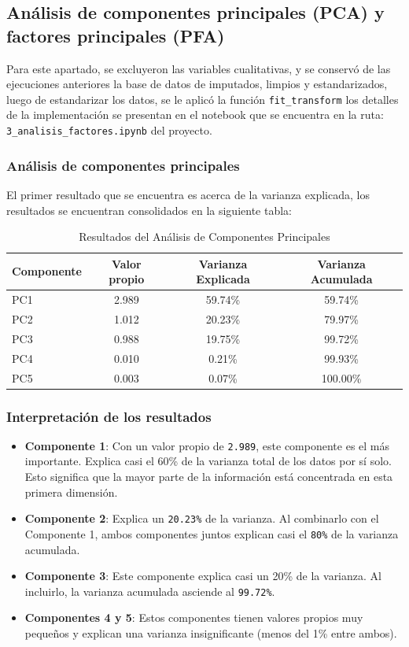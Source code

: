 \documentclass[journal]{IEEEtran}
\begin{document}
	\subsection{Análisis de componentes principales (PCA) y factores principales (PFA)}
	Para este apartado, se excluyeron las variables cualitativas, y se conservó de las ejecuciones anteriores la base de datos de imputados, limpios y estandarizados, luego de estandarizar los datos, se le aplicó la función \texttt{fit\_transform} los detalles de la implementación se presentan en el notebook que se encuentra en la ruta: \texttt{3\_analisis\_factores.ipynb} del proyecto.
	\subsubsection{Análisis de componentes principales}
	El primer resultado que se encuentra es acerca de la varianza explicada, los resultados se encuentran consolidados en la siguiente tabla:

	\begin{table}[H]
		\centering
		\caption{Resultados del Análisis de Componentes Principales}
		\begin{tabular}{l c c c}
			\toprule
			Componente & Valor propio & Varianza Explicada & Varianza Acumulada \\
			\midrule
			PC1 & 2.989 & 59.74\% & 59.74\% \\
			PC2 & 1.012 & 20.23\% & 79.97\% \\
			PC3 & 0.988 & 19.75\% & 99.72\% \\
			PC4 & 0.010 & 0.21\%  & 99.93\% \\
			PC5 & 0.003 & 0.07\% & 100.00\% \\
			\bottomrule
		\end{tabular}
		\label{tab:pca_results}
	\end{table}
	\subsubsection{Interpretación de los resultados}
	\begin{itemize}
		\item \textbf{Componente 1}: Con un valor propio de \texttt{2.989}, este componente es el más importante. Explica casi el 60\% de la varianza total de los datos por sí solo. Esto significa que la mayor parte de la información está concentrada en esta primera dimensión.
		\item \textbf{Componente 2}: Explica un \texttt{20.23\%} de la varianza. Al combinarlo con el Componente 1, ambos componentes juntos explican casi el \texttt{80\%} de la varianza acumulada.
		\item \textbf{Componente 3}: Este componente explica casi un 20\% de la varianza. Al incluirlo, la varianza acumulada asciende al \texttt{99.72\%}.
		\item \textbf{Componentes 4 y 5}: Estos componentes tienen valores propios muy pequeños y explican una varianza insignificante (menos del 1\% entre ambos).
	\end{itemize}
\end{document}
